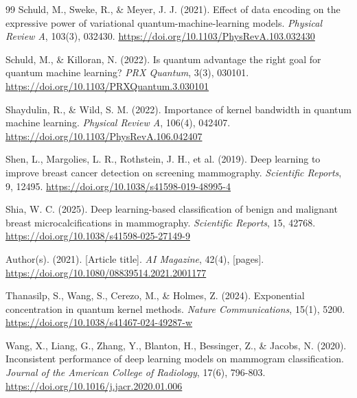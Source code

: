 \begin{thebibliography}{99}
    Schuld, M., Sweke, R., \& Meyer, J. J. (2021).
    Effect of data encoding on the expressive power of variational quantum-machine-learning models.
    \textit{Physical Review A}, 103(3), 032430.
    \url{https://doi.org/10.1103/PhysRevA.103.032430}

    Schuld, M., \& Killoran, N. (2022).
    Is quantum advantage the right goal for quantum machine learning?
    \textit{PRX Quantum}, 3(3), 030101.
    \url{https://doi.org/10.1103/PRXQuantum.3.030101}

    Shaydulin, R., \& Wild, S. M. (2022).
    Importance of kernel bandwidth in quantum machine learning.
    \textit{Physical Review A}, 106(4), 042407.
    \url{https://doi.org/10.1103/PhysRevA.106.042407}

    Shen, L., Margolies, L. R., Rothstein, J. H., et al. (2019). Deep learning to improve breast cancer
    detection on screening mammography. \textit{Scientific Reports}, 9, 12495.
    \url{https://doi.org/10.1038/s41598-019-48995-4}


    Shia, W. C. (2025). Deep learning-based classification of benign and malignant breast microcalcifications in
    mammography. \textit{Scientific Reports}, 15, 42768.
    \url{https://doi.org/10.1038/s41598-025-27149-9}


    Author(s). (2021). [Article title]. \textit{AI Magazine}, 42(4), [pages].
    \url{https://doi.org/10.1080/08839514.2021.2001177}


    Thanasilp, S., Wang, S., Cerezo, M., \& Holmes, Z. (2024).
    Exponential concentration in quantum kernel methods.
    \textit{Nature Communications}, 15(1), 5200.
    \url{https://doi.org/10.1038/s41467-024-49287-w}

    Wang, X., Liang, G., Zhang, Y., Blanton, H., Bessinger, Z., \& Jacobs, N. (2020).
    Inconsistent performance of deep learning models on mammogram classification.
    \textit{Journal of the American College of Radiology}, 17(6), 796-803.
    \url{https://doi.org/10.1016/j.jacr.2020.01.006}


\end{thebibliography}
